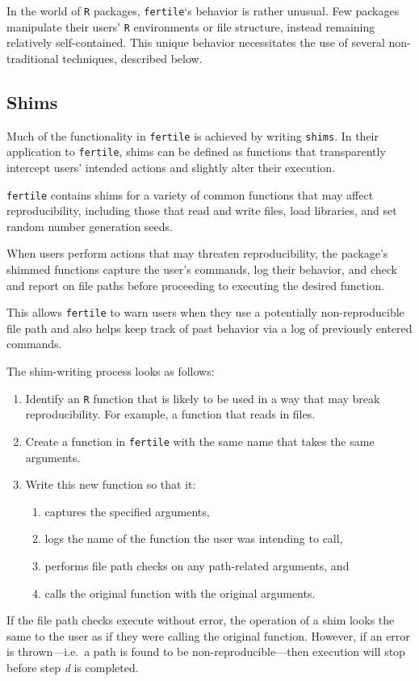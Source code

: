 \documentclass[12pt,twoside]{reedthesis}
\providecommand{\tightlist}{%
  \setlength{\itemsep}{0pt}\setlength{\parskip}{0pt}}
\begin{document}
In the world of \texttt{R} packages, \texttt{fertile}`s behavior is rather unusual. Few packages manipulate their users' \texttt{R} environments or file structure, instead remaining relatively self-contained. This unique behavior necessitates the use of several non-traditional techniques, described below.

\hypertarget{shims}{%
\subsection{Shims}\label{shims}}

Much of the functionality in \texttt{fertile} is achieved by writing \texttt{shims}. In their application to \texttt{fertile}, shims can be defined as functions that transparently intercept users' intended actions and slightly alter their execution.

\texttt{fertile} contains shims for a variety of common functions that may affect reproducibility, including those that read and write files, load libraries, and set random number generation seeds.

When users perform actions that may threaten reproducibility, the package's shimmed functions capture the user's commands, log their behavior, and check and report on file paths before proceeding to executing the desired function.

This allows \texttt{fertile} to warn users when they use a potentially non-reproducible file path and also helps keep track of past behavior via a log of previously entered commands.

The shim-writing process looks as follows:
\begin{enumerate}
\def\labelenumi{\arabic{enumi}.}
\item
  Identify an \texttt{R} function that is likely to be used in a way that may break reproducibility. For example, a function that reads in files.
\item
  Create a function in \texttt{fertile} with the same name that takes the same arguments.
\item
  Write this new function so that it:
  \begin{enumerate}
  \def\labelenumii{\alph{enumii})}
  \tightlist
  \item
    captures the specified arguments,
  \item
    logs the name of the function the user was intending to call,
  \item
    performs file path checks on any path-related arguments, and
  \item
    calls the original function with the original arguments.
  \end{enumerate}
\end{enumerate}
If the file path checks execute without error, the operation of a shim looks the same to the user as if they were calling the original function. However, if an error is thrown---i.e.~a path is found to be non-reproducible---then execution will stop before step \emph{d} is completed.
\end{document}

